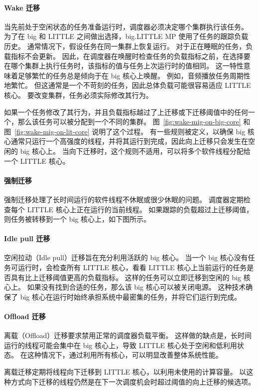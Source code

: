 \paragraph*{Wake 迁移}

当先前处于空闲状态的任务准备运行时，调度器必须决定哪个集群执行该任务。
为了在 big 和 LITTLE 之间做出选择，big.LITTLE MP 使用了任务的跟踪负载历史。
通常情况下，假设任务在同一集群上恢复运行。
对于正在睡眠的任务，负载指标不会更新。
因此，在调度器在唤醒时检查任务的负载指标之前，在选择要在哪个集群上执行任务时，该指标的值与任务上次运行时的值相同。
这一特性意味着足够繁忙的任务总是倾向于在 big 核心上唤醒。
例如，音频播放任务周期性地繁忙。
但这通常是一个不苛刻的任务，因此总体负载可能很容易适应 LITTLE 核心。
要改变集群，任务必须实际修改其行为。



如果一个任务修改了其行为，并且负载指标越过了上迁移或下迁移阈值中的任何一个，那么该任务可以被分配到一个不同的集群。
图~\ref{fig:wake-mig-on-big-core} 和图~\ref{fig:wake-mig-on-lit-core} 说明了这个过程。
有一些规则被定义，以确保 big 核心通常只运行一个高强度的线程，并将其运行到完成，因此向上迁移只会发生在空闲的 big 核心上。
当向下迁移时，这个规则不适用，可以将多个软件线程分配给一个 LITTLE 核心。

\paragraph*{强制迁移}

强制迁移处理了长时间运行的软件线程不休眠或很少休眠的问题。
调度器定期检查每个 LITTLE 核心上正在运行的当前线程。
如果跟踪的负载超过上迁移阈值，则任务被转移到一个 big 核心上，如下图所示。


\paragraph*{Idle pull 迁移}

空闲拉动（Idle pull）迁移旨在充分利用活跃的 big 核心。
当一个 big 核心没有任务可运行时，会检查所有 LITTLE 核心，看看 LITTLE 核心上当前运行的任务是否具有比上迁移阈值更高的负载指标。
这样的任务可以立即迁移到空闲的 big 核心上。
如果没有找到合适的任务，那么该 big 核心可以被关闭电源。
这种技术确保了 big 核心在运行时始终承担系统中最密集的任务，并将它们运行到完成。

\paragraph*{Offload 迁移}

离载（Offload）迁移要求禁用正常的调度器负载平衡。
这样做的缺点是，长时间运行的线程可能会集中在 big 核心上，导致 LITTLE 核心处于空闲和低利用状态。
在这种情况下，通过利用所有核心，可以明显改善整体系统性能。

离载迁移定期将线程向下迁移到 LITTLE 核心，以利用未使用的计算容量。
以这种方式向下迁移的线程仍然是在下一次调度机会时超过阈值的向上迁移的候选项。
